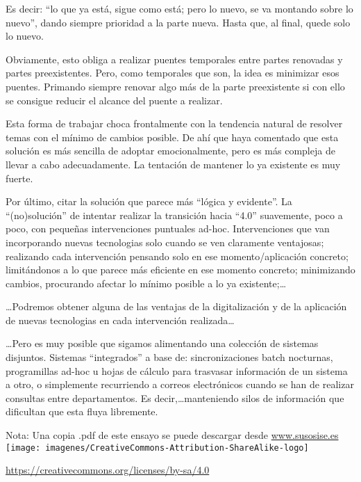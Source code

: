 \documentclass[11pt,a4paper]{article}
\begin{document}
Es decir: ``lo que ya está, sigue como está; pero lo nuevo, se va montando sobre lo nuevo'', dando siempre prioridad a la parte nueva. Hasta que, al final, quede solo lo nuevo.

Obviamente, esto obliga a realizar puentes temporales entre partes renovadas y partes preexistentes. Pero, como temporales que son, la idea es minimizar esos puentes. Primando siempre renovar algo más de la parte preexistente si con ello se consigue reducir el alcance del puente a realizar.

Esta forma de trabajar choca frontalmente con la tendencia natural de resolver temas con el mínimo de cambios posible. De ahí que haya comentado que esta solución es más sencilla de adoptar emocionalmente, pero es más compleja de llevar a cabo adecuadamente. La tentación de mantener lo ya existente es muy fuerte.

\vspace{0.5cm}

Por último, citar la solución que parece más ``lógica y evidente''. La ``(no)solución'' de intentar realizar la transición hacia ``4.0'' suavemente, poco a poco, con pequeñas intervenciones puntuales ad-hoc. Intervenciones que van incorporando nuevas tecnologias solo cuando se ven claramente ventajosas; realizando cada intervención pensando solo en ese momento/aplicación concreto; limitándonos a lo que parece más eficiente en ese momento concreto; minimizando cambios, procurando afectar lo mínimo posible a lo ya existente;\ldots

\ldots Podremos obtener alguna de las ventajas de la digitalización y de la aplicación de nuevas tecnologias en cada intervención realizada\ldots 

\ldots Pero es muy posible que sigamos alimentando una colección de sistemas disjuntos. Sistemas ``integrados'' a base de: sincronizaciones batch nocturnas, programillas ad-hoc u hojas de cálculo para trasvasar información de un sistema a otro, o simplemente recurriendo a correos electrónicos cuando se han de realizar consultas entre departamentos. Es decir,\ldots  manteniendo silos de información que dificultan que esta fluya libremente.


\vfill

Nota: Una copia .pdf de este ensayo se puede descargar desde \url{www.susosise.es}
\\ \texttt{[image: imagenes/CreativeCommons-Attribution-ShareAlike-logo]}
\begin{small}\url{https://creativecommons.org/licenses/by-sa/4.0}\end{small}
\end{document}
